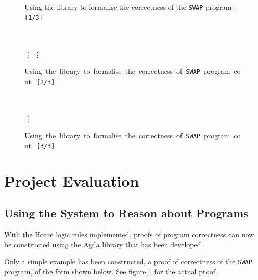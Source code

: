 \documentclass[oneside,12pt]{article}
\newcommand{\impcode}[1]{\textsc{\texttt{#1}}}
\begin{document}
\begin{figure}
  \caption{Using the library to formalise the correctness of the \impcode{SWAP} program: \;\; \impcode{[1/3]}}
  \label{fig:swap-proof}
  \hrulefill 
  {\centering }
\end{figure}

\begin{figure}\ContinuedFloat
  \caption{\mbox{Using the library to formalise the correctness of \impcode{SWAP} program cont. \;\; \impcode{[2/3]}} }
  \hrulefill\\
  \vspace{1em}\\
  \hspace*{\fill} {\Huge\vdots} \hspace*{\fill}
  {\centering }
  \hspace*{\fill} {\Huge\vdots} \hspace*{\fill}
\end{figure}

\begin{figure}\ContinuedFloat
  \caption{\mbox{Using the library to formalise the correctness of \impcode{SWAP} program cont. \;\; \impcode{[3/3]}} }  
  \hrulefill \\
  \vspace{2.5em}\\
  \hspace*{\fill} {\Huge\vdots} \hspace*{\fill}
  {\centering }
\end{figure}



\section{Project Evaluation}

\subsection{Using the System to Reason about Programs}

With the Hoare logic rules implemented, proofs of program correctness can now be constructed using the Agda library that has been developed.

Only a simple example has been constructed, a proof of correctness of the \impcode{SWAP} program, of the form shown below. See figure \ref{fig:swap-proof} for the actual proof.
\end{document}
